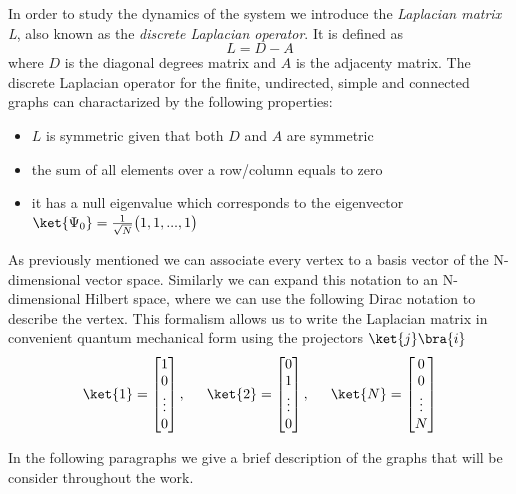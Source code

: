 In order to study the dynamics of the system we introduce the \textit{Laplacian matrix L}, also known as the \textit{discrete Laplacian operator}. It is defined as
\begin{equation}
    L = D-A
\end{equation}
where $D$ is the diagonal degrees matrix and $A$ is the adjacenty matrix. The discrete Laplacian operator for the finite, undirected, simple and connected graphs can charactarized by the following properties:
\begin{itemize}
  \item $L$ is symmetric given that both $D$ and $A$ are symmetric
  \item the sum of all elements over a row/column equals to zero
  \item it has a null eigenvalue which corresponds to the eigenvector $\ket{\Psi_0} = \frac{1}{\sqrt{N}}\big(1,1,...,1\big)$
\end{itemize}
As previously mentioned we can associate every vertex to a basis vector of the N-dimensional vector space. Similarly we can expand this notation to an N-dimensional Hilbert space, where we can use the following Dirac notation to describe the vertex. This formalism allows us to write the Laplacian matrix in convenient quantum mechanical form using the projectors $\ket{j}\bra{i}$
\begin{equation}
  \ket{1}=\begin{bmatrix} 1 \\ 0 \\ \vdots \\ 0\end{bmatrix}, \hspace{15pt}\ket{2}=\begin{bmatrix}0\\1\\\vdots\\0\end{bmatrix}, \hspace{15pt}\ket{N}=\begin{bmatrix}0\\0\\\vdots\\N\end{bmatrix}
\end{equation}


In the following paragraphs we give a brief description of the graphs that will be consider throughout the work. \\

